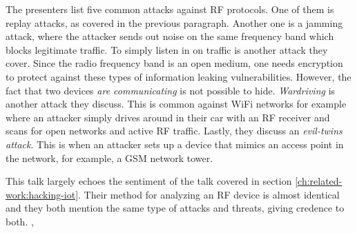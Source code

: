 The presenters list five common attacks against RF protocols. One of them is replay attacks, as covered in the previous paragraph. Another one is a jamming attack, where the attacker sends out noise on the same frequency band which blocks legitimate traffic. To simply listen in on traffic is another attack they cover. Since the radio frequency band is an open medium, one needs encryption to protect against these types of information leaking vulnerabilities. However, the fact that two devices \textit{are communicating} is not possible to hide. \textit{Wardriving} is another attack they discuss. This is common against WiFi networks for example where an attacker simply drives around in their car with an RF receiver and scans for open networks and active RF traffic. Lastly, they discuss an \textit{evil-twins attack}. This is when an attacker sets up a device that mimics an access point in the network, for example, a GSM network tower.

This talk largely echoes the sentiment of the talk covered in section \ref{ch:related-work:hacking-iot}. Their method for analyzing an RF device is almost identical and they both mention the same type of attacks and threats, giving credence to both.
,